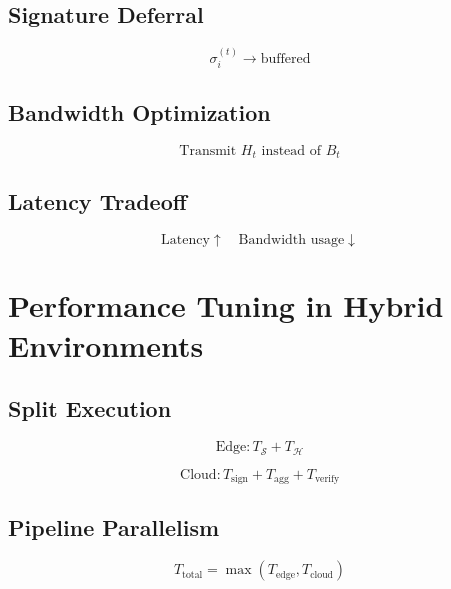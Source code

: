 \subsection{Signature Deferral}

\begin{equation}
\sigma_i^{(t)} \rightarrow \text{buffered}
\end{equation}

\subsection{Bandwidth Optimization}

\begin{equation}
\text{Transmit } H_t \text{ instead of } B_t
\end{equation}

\subsection{Latency Tradeoff}

\begin{equation}
\text{Latency} \uparrow \quad \text{Bandwidth usage} \downarrow
\end{equation}

\section{Performance Tuning in Hybrid Environments}

\subsection{Split Execution}

\begin{equation}
\text{Edge}: T_{\mathcal{S}} + T_{\mathcal{H}}
\end{equation}

\begin{equation}
\text{Cloud}: T_{\text{sign}} + T_{\text{agg}} + T_{\text{verify}}
\end{equation}

\subsection{Pipeline Parallelism}

\begin{equation}
T_{\text{total}} = \max(T_{\text{edge}}, T_{\text{cloud}})
\end{equation}

